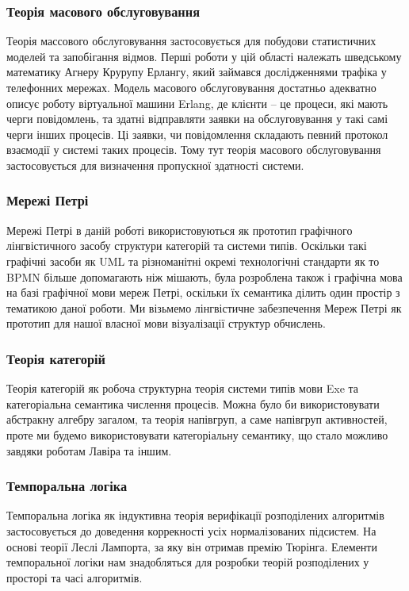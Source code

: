\documentclass[11pt,oneside]{article}
\begin{document}
   \subsubsection{Теорія масового обслуговування}
   Теорія массового обслуговування застосовується для побудови
   статистичних моделей та запобігання відмов. Перші роботи у цій області
   належать шведському математику Агнеру Крурупу Ерлангу, який займався
   дослідженнями трафіка у телефонних мережах. Модель масового обслуговування достатньо
   адекватно описує роботу віртуальної машини Erlang, де клієнти -- це процеси,
   які мають черги повідомлень, та здатні відправляти заявки на обслуговування
   у такі самі черги інших процесів. Ці заявки, чи повідомлення складають певний
   протокол взаємодії у системі таких процесів. Тому тут теорія масового обслуговування
   застосовується для визначення пропускної здатності системи.

   \subsubsection{Мережі Петрі}
   Мережі Петрі в даній роботі використовуються як прототип графічного
   лінгвістичного засобу структури категорій та системи типів. Оскільки
   такі графічні засоби як UML та різноманітні окремі технологічні
   стандарти як то BPMN більше допомагають ніж мішають, була розроблена
   також і графічна мова на базі графічної мови мереж Петрі, оскільки їх
   семантика ділить один простір з тематикою даної роботи. Ми візьмемо
   лінгвістичне забезпечення Мереж Петрі як прототип для нашої власної
   мови візуалізації структур обчислень.

   \subsubsection{Теорія категорій}
   Теорія категорій як робоча структурна теорія системи типів мови Exe та
   категоріальна семантика числення процесів. Можна було би використовувати абстракну алгебру загалом,
   та теорія напівгруп, а саме напівгруп активностей, проте ми будемо використовувати
   категоріальну семантику, що стало можливо завдяки роботам Лавіра та іншим.\\

   \subsubsection{Темпоральна логіка}
   Темпоральна логіка як індуктивна теорія верифікації розподілених алгоритмів
   застосовується до доведення коррекності усіх нормалізованих підсистем. На основі
   теорії  Леслі Лампорта\cite{tla}, за яку він отримав премію Тюрінга.
   Елементи темпоральної логіки нам знадобляться для розробки теорій
   розподілених у просторі та часі алгоритмів.\\
\end{document}
